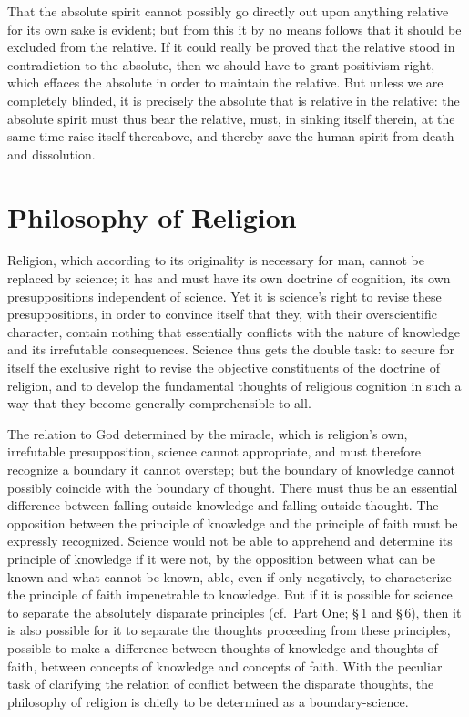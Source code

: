 \documentclass[12pt]{book}
\begin{document}
That the absolute spirit cannot possibly go directly out upon anything relative for its own sake is
evident; but from this it by no means follows that it should be excluded from the relative. If it
could really be proved that the relative stood in contradiction to the absolute, then we should have
to grant positivism right, which effaces the absolute in order to maintain the relative. But unless
we are completely blinded, it is precisely the absolute that is relative in the relative: the
absolute spirit must thus bear the relative, must, in sinking itself therein, at the same time raise
itself thereabove, and thereby save the human spirit from death and dissolution.

\section{Philosophy of Religion}
\label{sec:26en}

\noindent Religion, which according to its originality is necessary for man, cannot be replaced
by science; it has and must have its own doctrine of cognition, its own presuppositions
independent of science. Yet it is science's right to revise these presuppositions, in order to
convince itself that they, with their overscientific character, contain nothing that essentially
conflicts with the nature of knowledge and its irrefutable consequences. Science thus gets the
double task: to secure for itself the exclusive right to revise the objective constituents of the
doctrine of religion, and to develop the fundamental thoughts of religious cognition in such a
way that they become generally comprehensible to all.

The relation to God determined by the miracle, which is religion's own, irrefutable
presupposition, science cannot appropriate, and must therefore recognize a boundary it cannot
overstep; but the boundary of knowledge cannot possibly coincide with the boundary of thought.
There must thus be an essential difference between falling outside knowledge and falling outside
thought. The opposition between the principle of knowledge and the principle of faith must be
expressly recognized. Science would not be able to apprehend and determine its principle of
knowledge if it were not, by the opposition between what can be known and what cannot be known,
able, even if only negatively, to characterize the principle of faith impenetrable to knowledge.
But if it is possible for science to separate the absolutely disparate principles (cf.\ Part One;
\S\,1 and \S\,6), then it is also possible for it to separate the thoughts proceeding from these
principles, possible to make a difference between thoughts of knowledge and thoughts of faith,
between concepts of knowledge and concepts of faith. With the peculiar task of clarifying the
relation of conflict between the disparate thoughts, the philosophy of religion is chiefly to be
determined as a boundary-science.
\end{document}
